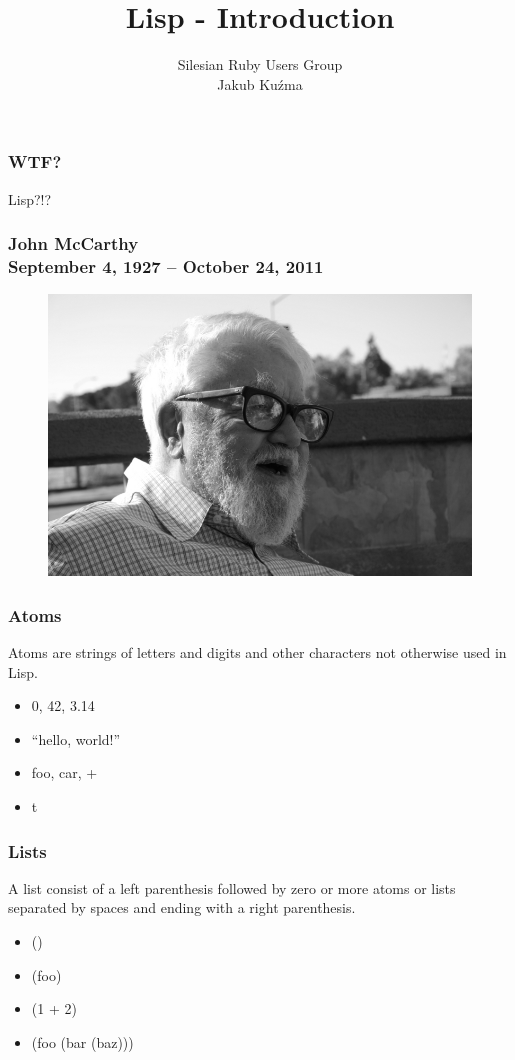 \documentclass[16pt]{beamer}
\author{Silesian Ruby Users Group\\\footnotesize{Jakub Kuźma}}
\title{Lisp - Introduction}
\begin{document}
\frame{\titlepage}

\begin{frame}
  \frametitle{WTF?}
  \begin{center}
    Lisp?!?
  \end{center}
\end{frame}

\begin{frame}
  \frametitle{John McCarthy\\September 4, 1927 -- October 24, 2011}
  \begin{figure}
    \includegraphics[width=0.8\linewidth]{mccarthy.jpg}
  \end{figure}
\end{frame}

\begin{frame}
  \frametitle{Atoms}
  \begin{block}{}
    Atoms are strings of letters and digits and other characters not
    otherwise used in Lisp.
  \end{block}
  \begin{itemize}
  \item 0, 42, 3.14
  \item ``hello, world!''
  \item foo, car, +
  \item t
  \end{itemize}
\end{frame}

\begin{frame}
  \frametitle{Lists}
  \begin{block}{}
    A list consist of a left parenthesis followed by zero or more
    atoms or lists separated by spaces and ending with a right
    parenthesis.
  \end{block}
  \begin{itemize}
  \item ()
  \item (foo)
  \item (1 + 2)
  \item (foo (bar (baz)))
  \end{itemize}
\end{frame}
\end{document}
